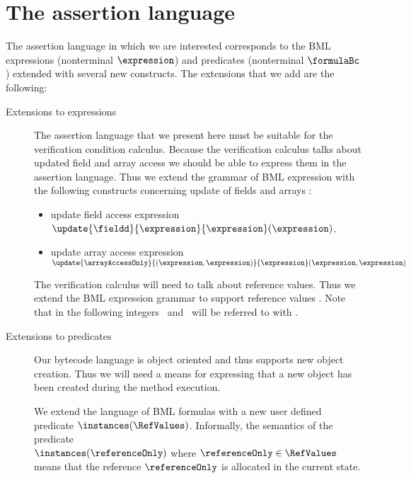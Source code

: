 \section{The assertion language} \label{assertLang:lang}
The assertion language in which we are interested corresponds to the
BML  expressions (nonterminal $\expression$) and predicates 
(nonterminal $\formulaBc$) extended with several new constructs.
 The extensions that we add are the following:
\begin{description}
    \item [Extensions to expressions] 
         The assertion language that we present here must be suitable for the verification condition calculus.
	 Because the verification calculus talks about updated field and array access
	 we should be able  to express  them in the assertion language. Thus we extend the grammar of BML expression
	 with the following constructs concerning update of fields and arrays :

        \begin{itemize}
	       \item update field access expression 
		  $\update{\fieldd}{ \expression}{\expression}(\expression)$.

	       \item update array access expression \\
                   $ \update{ \arrayAccessOnly}{ (\expression , \expression)}{ \expression} (\expression,\expression)$
	\end{itemize}

	The verification calculus will need to talk about reference values. Thus we extend the BML expression grammar to  support
	reference values \RefValues. Note that in the following integers \Myint\  and \RefValues \ will be referred to with \Values.
    \item [Extensions to predicates] Our bytecode language is object oriented and thus supports new object creation. Thus we
          will need a means for expressing that a new object has been created during the method execution. 

	  We extend the language of BML  formulas
	  with a new user defined predicate $ \instances(\RefValues)$. Informally, the semantics of the predicate \\
	  $\instances(\referenceOnly)$ where $\referenceOnly \in \RefValues$
	  means that the reference $\referenceOnly  $  is allocated in the current state.
        
\end{description}

